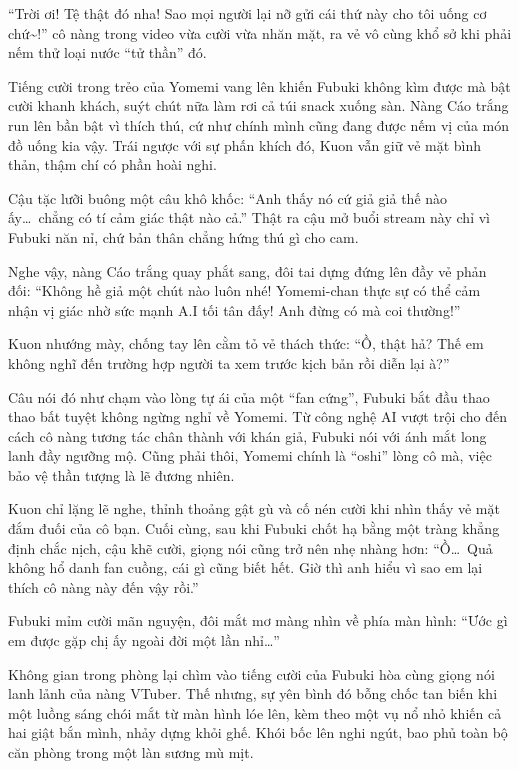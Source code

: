 \documentclass[../main.tex]{subfiles}
\begin{document}
``Trời ơi! Tệ thật đó nha! Sao mọi người lại nỡ gửi cái thứ này cho tôi uống cơ chứ\~{}!'' cô nàng trong video vừa cười vừa nhăn mặt, ra vẻ vô cùng khổ sở khi phải nếm thử loại nước ``tử thần'' đó.

Tiếng cười trong trẻo của Yomemi vang lên khiến Fubuki không kìm được mà bật cười khanh khách, suýt chút nữa làm rơi cả túi snack xuống sàn. Nàng Cáo trắng run lên bần bật vì thích thú, cứ như chính mình cũng đang được nếm vị của món đồ uống kia vậy. Trái ngược với sự phấn khích đó, Kuon vẫn giữ vẻ mặt bình thản, thậm chí có phần hoài nghi.

Cậu tặc lưỡi buông một câu khô khốc: ``Anh thấy nó cứ giả giả thế nào ấy\dots\ chẳng có tí cảm giác thật nào cả.'' Thật ra cậu mở buổi stream này chỉ vì Fubuki năn nỉ, chứ bản thân chẳng hứng thú gì cho cam.

Nghe vậy, nàng Cáo trắng quay phắt sang, đôi tai dựng đứng lên đầy vẻ phản đối: ``Không hề giả một chút nào luôn nhé! Yomemi-chan thực sự có thể cảm nhận vị giác nhờ sức mạnh A.I tối tân đấy! Anh đừng có mà coi thường!''

Kuon nhướng mày, chống tay lên cằm tỏ vẻ thách thức: ``Ồ, thật hả? Thế em không nghĩ đến trường hợp người ta xem trước kịch bản rồi diễn lại à?''

Câu nói đó như chạm vào lòng tự ái của một ``fan cứng'', Fubuki bắt đầu thao thao bất tuyệt không ngừng nghỉ về Yomemi. Từ công nghệ AI vượt trội cho đến cách cô nàng tương tác chân thành với khán giả, Fubuki nói với ánh mắt long lanh đầy ngưỡng mộ. Cũng phải thôi, Yomemi chính là ``oshi'' lòng cô mà, việc bảo vệ thần tượng là lẽ đương nhiên.

Kuon chỉ lặng lẽ nghe, thỉnh thoảng gật gù và cố nén cười khi nhìn thấy vẻ mặt đắm đuối của cô bạn. Cuối cùng, sau khi Fubuki chốt hạ bằng một tràng khẳng định chắc nịch, cậu khẽ cười, giọng nói cũng trở nên nhẹ nhàng hơn: ``Ồ\dots\ Quả không hổ danh fan cuồng, cái gì cũng biết hết. Giờ thì anh hiểu vì sao em lại thích cô nàng này đến vậy rồi.''

Fubuki mỉm cười mãn nguyện, đôi mắt mơ màng nhìn về phía màn hình: ``Ước gì em được gặp chị ấy ngoài đời một lần nhỉ\dots''

Không gian trong phòng lại chìm vào tiếng cười của Fubuki hòa cùng giọng nói lanh lảnh của nàng VTuber. Thế nhưng, sự yên bình đó bỗng chốc tan biến khi một luồng sáng chói mắt từ màn hình lóe lên, kèm theo một vụ nổ nhỏ khiến cả hai giật bắn mình, nhảy dựng khỏi ghế. Khói bốc lên nghi ngút, bao phủ toàn bộ căn phòng trong một làn sương mù mịt.
\end{document}
